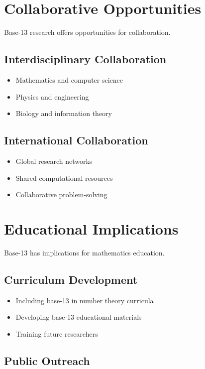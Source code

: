 \documentclass[12pt,a4paper]{report}
\begin{document}
\section{Collaborative Opportunities}

Base-13 research offers opportunities for collaboration.

\subsection{Interdisciplinary Collaboration}

\begin{itemize}
\item Mathematics and computer science
\item Physics and engineering
\item Biology and information theory
\end{itemize}

\subsection{International Collaboration}

\begin{itemize}
\item Global research networks
\item Shared computational resources
\item Collaborative problem-solving
\end{itemize}

\section{Educational Implications}

Base-13 has implications for mathematics education.

\subsection{Curriculum Development}

\begin{itemize}
\item Including base-13 in number theory curricula
\item Developing base-13 educational materials
\item Training future researchers
\end{itemize}

\subsection{Public Outreach}
\end{document}
